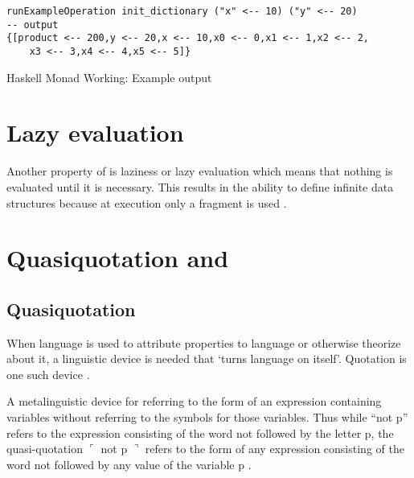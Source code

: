 \documentclass[thesis-solanki.tex]{subfiles}
\begin{document}
\begin{code-list}[H]
  \begin{singlespace}
\begin{verbatim}
runExampleOperation init_dictionary ("x" <-- 10) ("y" <-- 20)
-- output
{[product <-- 200,y <-- 20,x <-- 10,x0 <-- 0,x1 <-- 1,x2 <-- 2,
    x3 <-- 3,x4 <-- 4,x5 <-- 5]}
\end{verbatim}
  \end{singlespace}
  \caption{Haskell Monad Working: Example output}
\label{tab:hskllmndworkngexamplesoutput}
\end{code-list}


\section{Lazy evaluation}
Another property of  is laziness or lazy evaluation which means that nothing is evaluated until
it is necessary.
This results in the ability to define infinite data structures because at execution only a fragment is used
\cite{website:haskelllazinesswiki}.


\section{Quasiquotation and }
\subsection{Quasiquotation}

When language is used to attribute properties to language or otherwise theorize about it, a linguistic device is needed that `turns 
language on itself'. Quotation is one such device \cite{website:quotationstanford}.

A metalinguistic device for referring to the form of an expression containing variables without referring to the symbols for those 
variables. Thus while ``not p'' refers to the expression consisting of the word not followed by the letter p, the quasi-quotation \newline
$\ulcorner$ not p $\urcorner$ refers to the form of any expression consisting of the word not followed by any value of the variable p 
\cite{website:quasiquotationfreedictionary}.
\end{document}
